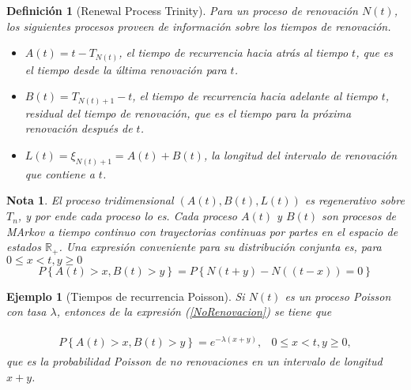\documentclass{article}
\newtheorem{Def}{Definición}
\newtheorem{Ejem}{Ejemplo}
\newtheorem{Note}{Nota}
\newcommand{\rea}{\mathbb{R}}
\begin{document}
\begin{Def}[Renewal Process Trinity]
Para un proceso de renovaci\'on $N\left(t\right)$, los siguientes procesos proveen de informaci\'on sobre los tiempos de renovaci\'on.
\begin{itemize}
\item $A\left(t\right)=t-T_{N\left(t\right)}$, el tiempo de recurrencia hacia atr\'as al tiempo $t$, que es el tiempo desde la \'ultima renovaci\'on para $t$.

\item $B\left(t\right)=T_{N\left(t\right)+1}-t$, el tiempo de recurrencia hacia adelante al tiempo $t$, residual del tiempo de renovaci\'on, que es el tiempo para la pr\'oxima renovaci\'on despu\'es de $t$.

\item $L\left(t\right)=\xi_{N\left(t\right)+1}=A\left(t\right)+B\left(t\right)$, la longitud del intervalo de renovaci\'on que contiene a $t$.
\end{itemize}
\end{Def}

\begin{Note}
El proceso tridimensional $\left(A\left(t\right),B\left(t\right),L\left(t\right)\right)$ es regenerativo sobre $T_{n}$, y por ende cada proceso lo es. Cada proceso $A\left(t\right)$ y $B\left(t\right)$ son procesos de MArkov a tiempo continuo con trayectorias continuas por partes en el espacio de estados $\rea_{+}$. Una expresi\'on conveniente para su distribuci\'on conjunta es, para $0\leq x<t,y\geq0$
\begin{equation}\label{NoRenovacion}
P\left\{A\left(t\right)>x,B\left(t\right)>y\right\}=
P\left\{N\left(t+y\right)-N\left((t-x)\right)=0\right\}
\end{equation}
\end{Note}

\begin{Ejem}[Tiempos de recurrencia Poisson]
Si $N\left(t\right)$ es un proceso Poisson con tasa $\lambda$, entonces de la expresi\'on (\ref{NoRenovacion}) se tiene que

\begin{eqnarray*}
\begin{array}{lc}
P\left\{A\left(t\right)>x,B\left(t\right)>y\right\}=e^{-\lambda\left(x+y\right)},&0\leq x<t,y\geq0,
\end{array}
\end{eqnarray*}
que es la probabilidad Poisson de no renovaciones en un intervalo de longitud $x+y$.

\end{Ejem}
\end{document}
